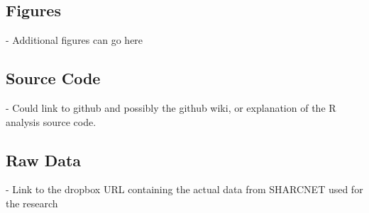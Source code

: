 \documentclass{sig-alternate}
\begin{document}
\subsection{Figures}

- Additional figures can go here

\subsection{Source Code}

- Could link to github and possibly the github wiki, or explanation
  of the R analysis source code.

\subsection{Raw Data}

- Link to the dropbox URL containing the actual data from SHARCNET used for the research
\end{document}
